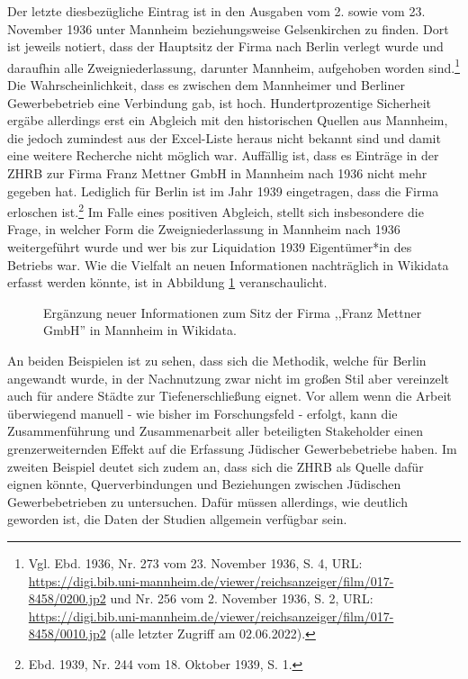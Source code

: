 Der letzte diesbezügliche Eintrag ist in den Ausgaben vom 2. sowie vom 23. November 1936 unter Mannheim beziehungsweise Gelsenkirchen zu finden. Dort ist jeweils notiert, dass der Hauptsitz der Firma nach Berlin verlegt wurde und daraufhin alle Zweigniederlassung, darunter Mannheim, aufgehoben worden sind.\footnote{Vgl. Ebd. 1936, Nr. 273 vom 23. November 1936, S. 4, URL: \url{https://digi.bib.uni-mannheim.de/viewer/reichsanzeiger/film/017-8458/0200.jp2} und Nr. 256 vom 2. November 1936, S. 2, URL: \url{https://digi.bib.uni-mannheim.de/viewer/reichsanzeiger/film/017-8458/0010.jp2} (alle letzter Zugriff am 02.06.2022).} Die Wahrscheinlichkeit, dass es zwischen dem Mannheimer und Berliner Gewerbebetrieb eine Verbindung gab, ist hoch. Hundertprozentige Sicherheit ergäbe allerdings erst ein Abgleich mit den historischen Quellen aus Mannheim, die jedoch zumindest aus der Excel-Liste heraus nicht bekannt sind und damit eine weitere Recherche nicht möglich war. Auffällig ist, dass es Einträge in der ZHRB zur Firma Franz Mettner GmbH in Mannheim nach 1936 nicht mehr gegeben hat. Lediglich für Berlin ist im Jahr 1939 eingetragen, dass die Firma erloschen ist.\footnote{Ebd. 1939, Nr. 244 vom 18. Oktober 1939, S. 1.} Im Falle eines positiven Abgleich, stellt sich insbesondere die Frage, in welcher Form die Zweigniederlassung in Mannheim nach 1936 weitergeführt wurde und wer bis zur Liquidation 1939 Eigentümer*in des Betriebs war. Wie die Vielfalt an neuen Informationen nachträglich in Wikidata erfasst werden könnte, ist in Abbildung \ref{fig:wikidatamettner} veranschaulicht. 

\begin{figure}[h]
    \centering
    \caption{Ergänzung neuer Informationen zum Sitz der Firma ,,Franz Mettner GmbH'' in Mannheim in Wikidata.}
    \label{fig:wikidatamettner}
\end{figure}

An beiden Beispielen ist zu sehen, dass sich die Methodik, welche für Berlin angewandt wurde, in der Nachnutzung zwar nicht im großen Stil aber vereinzelt auch für andere Städte zur Tiefenerschließung eignet. Vor allem wenn die Arbeit überwiegend manuell - wie bisher im Forschungsfeld - erfolgt, kann die Zusammenführung und Zusammenarbeit aller beteiligten Stakeholder einen grenzerweiternden Effekt auf die Erfassung Jüdischer Gewerbebetriebe haben. Im zweiten Beispiel deutet sich zudem an, dass sich die ZHRB als Quelle dafür eignen könnte, Querverbindungen und Beziehungen zwischen Jüdischen Gewerbebetrieben zu untersuchen. Dafür müssen allerdings, wie deutlich geworden ist, die Daten der Studien allgemein verfügbar sein.

